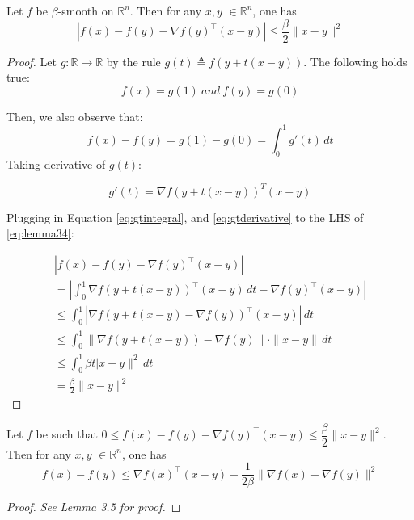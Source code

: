 \documentclass{article}
\begin{document}
\begin{lemma}\label{lemma:smooth-sandwich}
	Let $f$ be $\beta$-smooth on $\mathbb{R}^n$. Then for any $x,y$ $\in \mathbb{R}^n$, one has
     \begin{equation} \label{eq:lemma34}
	|f(x) - f(y) - \nabla f(y)^\intercal (x-y) | \leq \dfrac{\beta}{2} \| x-y \|^2
    \end{equation}
\end{lemma}

\begin{proof} Let $g: \mathbb{R}\to \mathbb{R}$ by the rule $g(t) \triangleq f(y+t(x-y))$. The following holds true:
$$f(x)=g(1) \: and \: f(y) = g(0)$$

Then, we also observe that:
\begin{equation} \label{eq:gtintegral}
f(x) - f(y) = g(1) - g(0) = \int_{0}^{1}g'(t) \, dt 
\end{equation}
Taking derivative of $g(t):$

\begin{equation} \label{eq:gtderivative}
g'(t) = \nabla f(y+t(x-y))^T (x-y)
\end{equation}

Plugging in Equation \ref{eq:gtintegral}, and \ref{eq:gtderivative} to the LHS of \ref{eq:lemma34}:

\begin{align*}
	&	|f(x) - f(y) - \nabla f(y)^\intercal (x-y) |&\\
	&= |\int_{0}^{1} \nabla f(y+t(x-y))^\intercal (x-y) \, dt - \nabla f(y)^\intercal (x-y) |\\
	&\leq \int_{0}^{1} |\nabla f(y+t(x-y)-\nabla f(y))^\intercal (x-y)|\, dt\\
	&\leq \int_{0}^{1} \|\nabla f(y+t(x-y))-\nabla f(y)\| \cdot \|x-y \|  \, dt \tag{applying Cauchy–Schwarz inequality  } \\
	&\leq \int_{0}^{1} \beta t|x-y \|^2  \, dt \tag{the gradient $\nabla f$ is $\beta$  -Lipschitz.} \\
	&= \frac{\beta}{2}\|x-y\|^2 \,
\end{align*}{}


\end{proof}


\begin{lemma}
	Let $f$ be such that $0 \leq f(x)-f(y)-\nabla f(y)^\intercal(x-y) \leq \dfrac{\beta}{2} \| x-y \|^2$. Then for any $x,y$ $\in \mathbb{R}^n$, one has
 \[
	f(x) - f(y) \leq \nabla f(x)^\intercal (x-y) - \dfrac{1}{2 \beta} \| \nabla f(x)-\nabla f(y) \|^2
\]    
\end{lemma}
\begin{proof}
\textit{See \cite{bubeck2015convex} Lemma 3.5 for proof.}
\end{proof}
\end{document}
